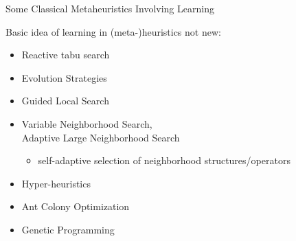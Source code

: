 \documentclass[aspectratio=1610]{beamer}
\newcommand{\important}[1]{{\color{green!60!black}#1}}
\renewcommand{\footnotesize}{\scriptsize}
\begin{document}
\begin{frame}{Some Classical Metaheuristics Involving Learning}

  \important{Basic idea of learning in (meta-)heuristics not new:}

  \bigskip
  \begin{itemize}
  \itemsep2.5ex
	
	\item Reactive tabu search
	\item Evolution Strategies
	\item Guided Local Search 
	\item Variable Neighborhood Search, \\
	Adaptive Large Neighborhood Search
	\begin{itemize}
		\item self-adaptive selection of neighborhood structures/operators
	\end{itemize}
	\item Hyper-heuristics
	\item Ant Colony Optimization
	\item Genetic Programming
  \end{itemize}
\end{frame}



\end{document}
